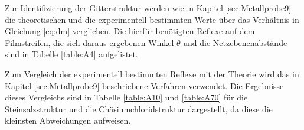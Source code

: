 

Zur Identifizierung der Gitterstruktur werden wie in Kapitel \ref{sec:Metallprobe9} die theoretischen und die experimentell bestimmten Werte über das Verhältnis in Gleichung \ref{eq:dm} verglichen. Die hierfür benötigten Reflexe auf dem Filmstreifen, die sich daraus ergebenen Winkel $\theta$ und die Netzebenenabstände sind in Tabelle \ref{table:A4} aufgelistet.



Zum Vergleich der experimentell bestimmten Reflexe mit der Theorie wird das in Kapitel \ref{sec:Metallprobe9} beschriebene Verfahren verwendet. Die Ergebnisse dieses Vergleichs sind in Tabelle \ref{table:A10} und \ref{table:A70} für die Steinsalzstruktur und die Chäsiumchloridstruktur dargestellt, da diese die kleinsten Abweichungen aufweisen.

% 


